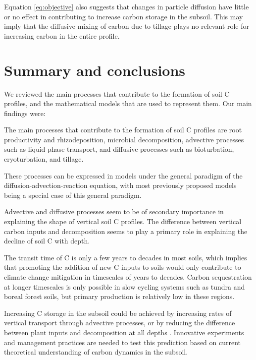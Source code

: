 \documentclass[11pt, oneside, a4paper]{article}   	%
\providecommand{\DIFaddtex}[1]{{\protect\color{blue}\uwave{#1}}} %
\providecommand{\DIFaddbegin}{} %
\providecommand{\DIFaddend}{} %
\providecommand{\DIFadd}[1]{\texorpdfstring{\DIFaddtex{#1}}{#1}} %
\newcommand{\DIFaddincludegraphics}[2][]{{\color{blue}\fbox{\DIFOincludegraphics[#1]{#2}}}} %
\DeclareRobustCommand{\DIFaddbegin}{\DIFOaddbegin \let\includegraphics\DIFaddincludegraphics} %
\DeclareRobustCommand{\DIFaddend}{\DIFOaddend \let\includegraphics\DIFOincludegraphics} %
\begin{document}
Equation \ref{eq:objective} also suggests that changes in particle diffusion have little or no effect in contributing to increase carbon storage in the subsoil. This may imply that the diffusive mixing of carbon due to tillage plays no relevant role for increasing carbon in the entire profile. 

\section{Summary and conclusions}
We reviewed the main processes that contribute to the formation of soil C profiles, and the mathematical models that are used to represent them. 
Our main findings were: 
\begin{enumerate*}
\item The main processes that contribute to the formation of soil C profiles are root productivity and rhizodeposition, microbial decomposition, advective processes such as liquid phase transport, and diffusive processes such as bioturbation, cryoturbation, and tillage. 
\item These processes can be expressed in models under the general paradigm of the diffusion-advection-reaction equation, with most previously proposed models being a special case of this general paradigm. 
\item Advective and diffusive processes seem to be of secondary importance in explaining the shape of vertical soil C profiles. The difference between vertical carbon inputs and decomposition seems to play a primary role in explaining the decline of soil C with depth. 
\item The transit time of C is only a few years to decades in most soils, which implies that promoting the addition of new C inputs to soils would only contribute to climate change mitigation in timescales of years to decades. Carbon sequestration at longer timescales is only possible in slow cycling systems such as tundra and boreal forest soils, but primary production is relatively low in these regions.
\item Increasing C storage in the subsoil could be achieved by increasing rates of vertical transport through advective processes, or by reducing the difference between plant inputs and decomposition at all depths \DIFaddbegin \DIFadd{according to equation (\ref{eq:objective})}\DIFaddend . Innovative experiments and management practices are needed to test this prediction based on current theoretical understanding of carbon dynamics in the subsoil. 
\end{enumerate*}
\end{document}
